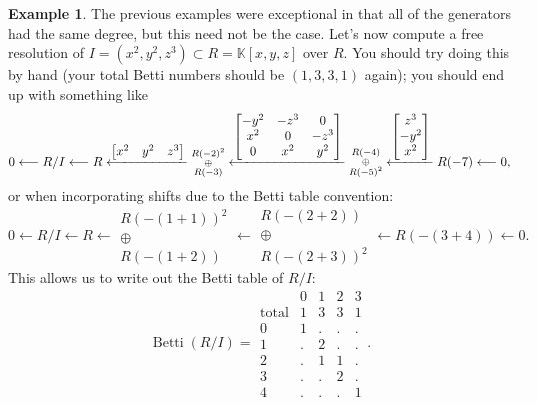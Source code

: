 \documentclass[12pt,a4paper]{article}
\newcommand{\KK}{\mathbb{K}}
\DeclareMathOperator{\Betti}{Betti}
\theoremstyle{definition}
\newtheorem{example}[theorem]{Example}
\numberwithin{equation}{section}
\begin{document}
\begin{example}
    The previous examples were exceptional in that all of the generators had the same degree, but this need not be the case.
    Let's now compute a free resolution of $I = (x^2, y^2, z^3) \subset R = \KK[x,y,z]$ over $R$.
    You should try doing this by hand (your total Betti numbers should be $(1,3,3,1)$ again); you should end up with something like
    \begin{equation*}
        0 \longleftarrow R/I \longleftarrow R \xlongleftarrow[]{\begin{bmatrix} x^2 & y^2 & z^3 \end{bmatrix}} \substack{R(-2)^2 \\ \oplus \\ R(-3)} \xlongleftarrow[]{\begin{bmatrix} -y^2 & -z^3 & 0 \\ x^2 & 0 & -z^3 \\ 0 & x^2 & y^2 \end{bmatrix}} \substack{R(-4) \\ \oplus \\ R(-5)^2} \xlongleftarrow[]{\begin{bmatrix} z^3 \\ -y^2 \\ x^2 \end{bmatrix}} R(-7) \longleftarrow 0,
    \end{equation*}
    or when incorporating shifts due to the Betti table convention:
    \begin{equation*}
        0 \longleftarrow R/I \longleftarrow R \longleftarrow \substack{R(-(1+1))^2 \\ \oplus \\ R(-(1+2))} \longleftarrow \substack{R(-(2+2)) \\ \oplus \\ R(-(2+3))^2} \longleftarrow R(-(3+4)) \longleftarrow 0.
    \end{equation*}
    This allows us to write out the Betti table of $R/I$:
    \begin{equation*}
        \Betti(R/I) =
        \begin{array}{r|cccc}
          & 0 & 1 & 2 & 3 \\
        \hline
        \text{total} & 1 & 3 & 3 & 1 \\
        \hline
         0 & 1 & . & . & . \\
         1 & . & 2 & . & . \\
         2 & . & 1 & 1 & . \\
         3 & . & . & 2 & . \\
         4 & . & . & . & 1
    \end{array}.
    \end{equation*}
\end{example}
\end{document}
